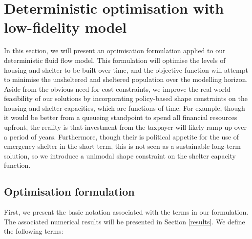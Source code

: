 \documentclass[12pt,a4paper]{article}
\begin{document}
\section{Deterministic optimisation with low-fidelity model} \label{do}
%
In this section, we will present an optimisation formulation applied to our deterministic fluid flow model. This formulation will optimise the levels of housing and shelter to be built over time, and the objective function will attempt to minimise the unsheltered and sheltered population over the modelling horizon. Aside from the obvious need for cost constraints, we improve the real-world feasibility of our solutions by incorporating policy-based shape constraints on the housing and shelter capacities, which are functions of time. For example, though it would be better from a queueing standpoint to spend all financial resources upfront, the reality is that investment from the taxpayer will likely ramp up over a period of years. Furthermore, though their is political appetite for the use of emergency shelter in the short term, this is not seen as a sustainable long-term solution, so we introduce a unimodal shape constraint on the shelter capacity function.
%
\subsection{Optimisation formulation} \label{opt}
%
First, we present the basic notation associated with the terms in our formulation. The associated numerical results will be presented in Section \ref{results}. We define the following terms:
\end{document}
